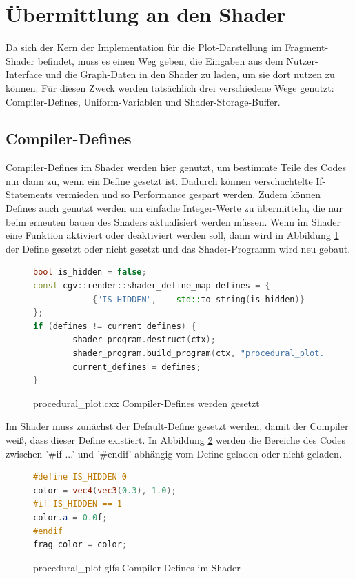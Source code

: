 \section{Übermittlung an den Shader}
Da sich der Kern der Implementation für die Plot-Darstellung im Fragment-Shader befindet, muss es einen Weg geben, die Eingaben aus dem Nutzer-Interface und die Graph-Daten in den Shader zu laden, um sie dort nutzen zu können.
Für diesen Zweck werden tatsächlich drei verschiedene Wege genutzt: Compiler-Defines, Uniform-Variablen und Shader-Storage-Buffer.

\subsection{Compiler-Defines}
Compiler-Defines im Shader werden hier genutzt, um bestimmte Teile des Codes nur dann zu, wenn ein Define gesetzt ist.
Dadurch können verschachtelte If-Statements vermieden und so Performance gespart werden.
Zudem können Defines auch genutzt werden um einfache Integer-Werte zu übermitteln, die nur beim erneuten bauen des Shaders aktualisiert werden müssen.
Wenn im Shader eine Funktion aktiviert oder deaktiviert werden soll, dann wird in Abbildung \ref{fig:code_cd1} der Define gesetzt oder nicht gesetzt und das Shader-Programm wird neu gebaut.
\begin{figure}[ht]
	\begin{lstlisting}[language=C++]
bool is_hidden = false;
const cgv::render::shader_define_map defines = {
            {"IS_HIDDEN",    std::to_string(is_hidden)}
};
if (defines != current_defines) {
        shader_program.destruct(ctx);
        shader_program.build_program(ctx, "procedural_plot.glpr", true, defines);
        current_defines = defines;
}
	\end{lstlisting}
	\caption{procedural\_plot.cxx Compiler-Defines werden gesetzt}
	\label{fig:code_cd1}
\end{figure}
\par
Im Shader muss zunächst der Default-Define gesetzt werden, damit der Compiler weiß, dass dieser Define existiert.
In Abbildung \ref{fig:code_cd2} werden die Bereiche des Codes zwischen '\#if ...' und '\#endif' abhängig vom Define geladen oder nicht geladen.
\begin{figure}[ht]
	\begin{lstlisting}[language=GLSL]
#define IS_HIDDEN 0
color = vec4(vec3(0.3), 1.0);
#if IS_HIDDEN == 1
color.a = 0.0f;
#endif
frag_color = color;
	\end{lstlisting}
	\caption{procedural\_plot.glfs Compiler-Defines im Shader}
	\label{fig:code_cd2}
\end{figure}
\FloatBarrier


